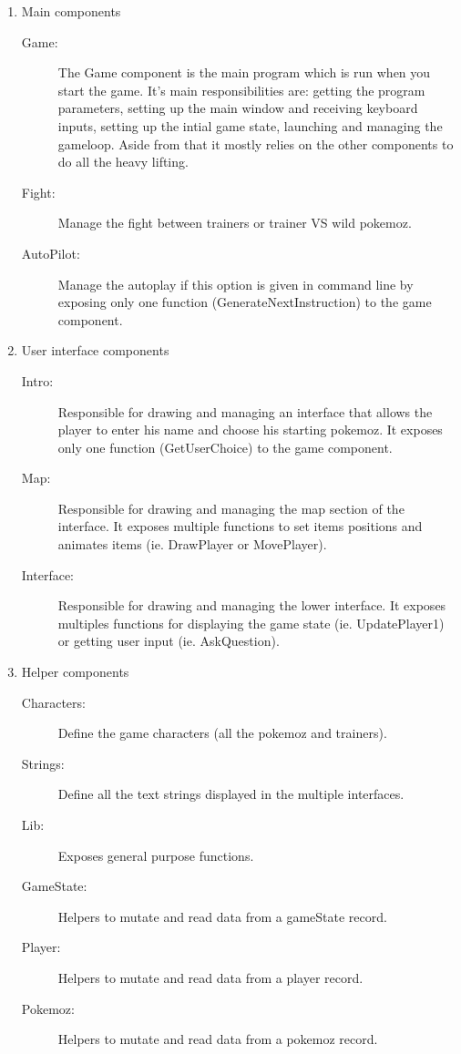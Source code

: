 \documentclass[10pt, a4paper]{article}
\begin{document}
\begin{enumerate}
  \item Main components
    \begin{description}
     \item[Game:] The Game component is the main program which is run when you start the game. It's main responsibilities are: getting the program parameters, setting up the main window and receiving keyboard inputs, setting up the intial game state, launching and managing the gameloop. Aside from that it mostly relies on the other components to do all the heavy lifting.
     \item[Fight:] Manage the fight between trainers or trainer VS wild pokemoz.
     \item[AutoPilot:] Manage the autoplay if this option is given in command line by exposing only one function (GenerateNextInstruction) to the game component.
    \end{description}
  \item User interface components
    \begin{description}
     \item[Intro:] Responsible for drawing and managing an interface that allows the player to enter his name and choose his starting pokemoz. It exposes only one function (GetUserChoice) to the game component.
     \item[Map:] Responsible for drawing and managing the map section of the interface. It exposes multiple functions to set items positions and animates items (ie. DrawPlayer or MovePlayer).
     \item[Interface:] Responsible for drawing and managing the lower interface. It exposes multiples functions for displaying the game state (ie. UpdatePlayer1) or getting user input (ie. AskQuestion).
    \end{description}
  \item Helper components
    \begin{description}
     \item[Characters:] Define the game characters (all the pokemoz and trainers).
     \item[Strings:] Define all the text strings displayed in the multiple interfaces.
     \item[Lib:] Exposes general purpose functions.
     \item[GameState:] Helpers to mutate and read data from a gameState record.
     \item[Player:] Helpers to mutate and read data from a player record.
     \item[Pokemoz:] Helpers to mutate and read data from a pokemoz record.
    \end{description}
\end{enumerate}
\end{document}
